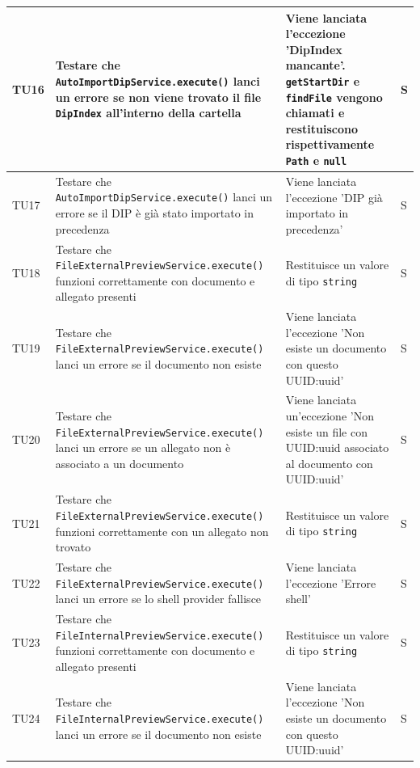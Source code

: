 \documentclass[a4paper,12pt]{article}
\begin{document}
\begin{longtable}{|M{1.2cm}|M{5cm}|M{7cm}|M{1.5cm}|}
            TU16 & Testare che \texttt{AutoImportDipService.execute()} lanci un errore se non viene trovato il file \texttt{DipIndex} all'interno della cartella & Viene lanciata l'eccezione 'DipIndex mancante'. \texttt{getStartDir} e \texttt{findFile} vengono chiamati e restituiscono rispettivamente \texttt{Path} e \texttt{null} & S \\
            \hline

            TU17 & Testare che \texttt{AutoImportDipService.execute()} lanci un errore se il DIP è già stato importato in precedenza & Viene lanciata l'eccezione 'DIP già importato in precedenza' & S \\
            \hline

            TU18 & Testare che \texttt{FileExternalPreviewService.execute()} funzioni correttamente con documento e allegato presenti & Restituisce un valore di tipo \texttt{string} & S \\
            \hline

            TU19 & Testare che \texttt{FileExternalPreviewService.execute()} lanci un errore se il documento non esiste & Viene lanciata l'eccezione 'Non esiste un documento con questo UUID:uuid' & S \\
            \hline

            TU20 & Testare che \texttt{FileExternalPreviewService.execute()} lanci un errore se un allegato non è associato a un documento & Viene lanciata un'eccezione 'Non esiste un file con UUID:uuid associato al documento con UUID:uuid' & S \\
            \hline

            TU21 & Testare che \texttt{FileExternalPreviewService.execute()} funzioni correttamente con un allegato non trovato & Restituisce un valore di tipo \texttt{string} & S \\
            \hline

            TU22 & Testare che \texttt{FileExternalPreviewService.execute()} lanci un errore se lo shell provider fallisce & Viene lanciata l'eccezione 'Errore shell' & S \\
            \hline

            TU23 & Testare che \texttt{FileInternalPreviewService.execute()} funzioni correttamente con documento e allegato presenti & Restituisce un valore di tipo \texttt{string} & S \\
            \hline

            TU24 & Testare che \texttt{FileInternalPreviewService.execute()} lanci un errore se il documento non esiste & Viene lanciata l'eccezione 'Non esiste un documento con questo UUID:uuid' & S \\
            \hline


\end{longtable}
\end{document}
